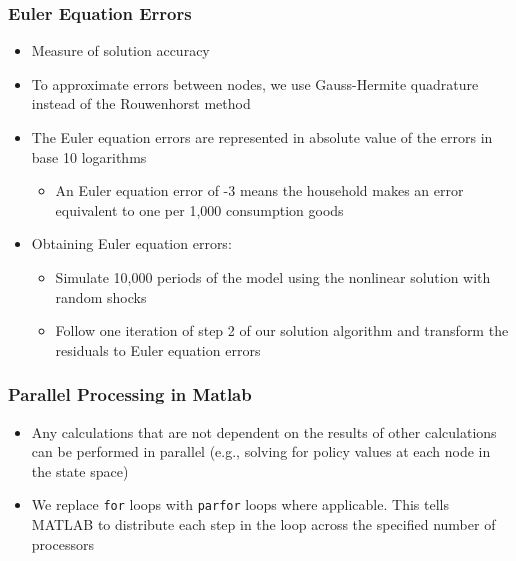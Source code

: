 \documentclass[11pt]{beamer}
\begin{document}
\begin{frame}\frametitle{Euler Equation Errors}
\begin{itemize}\setlength{\itemsep}{8pt}
\item Measure of solution accuracy
\item To approximate errors between nodes, we use Gauss-Hermite quadrature instead of the Rouwenhorst method %
\item The Euler equation errors are represented in absolute value of the errors in base 10 logarithms
\begin{itemize}\setlength{\itemsep}{2pt}
\item An Euler equation error of -3 means the household makes an error equivalent to one per 1,000 consumption goods
\end{itemize}
\item Obtaining Euler equation errors:
\begin{itemize}\setlength{\itemsep}{2pt}
\item Simulate 10,000 periods of the model using the nonlinear solution with random shocks 
\item Follow one iteration of step 2 of our solution algorithm and transform the residuals to Euler equation errors
\end{itemize}
\end{itemize}
\end{frame}



\begin{frame}\frametitle{Parallel Processing in Matlab}

\begin{itemize}\setlength{\itemsep}{14pt}
  \item Any calculations that are not dependent on the results of other calculations can be performed in parallel (e.g., solving for policy values at each node in the state space)
  \item We replace \texttt{for} loops with \texttt{parfor} loops where applicable. This tells MATLAB to distribute each step in the loop across the specified number of processors
\end{itemize}

\end{frame}
\end{document}
